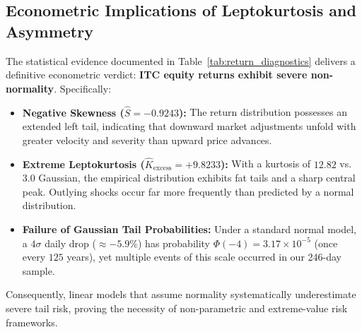 \subsection{Econometric Implications of Leptokurtosis and Asymmetry}

The statistical evidence documented in Table~\ref{tab:return_diagnostics} delivers a definitive econometric verdict: \textbf{ITC equity returns exhibit severe non-normality}. Specifically:
\begin{itemize}[leftmargin=1.2em, itemsep=0.5pt, parsep=0pt]
    \item \textbf{Negative Skewness ($\hat{S} = -0.9243$):} The return distribution possesses an extended left tail, indicating that downward market adjustments unfold with greater velocity and severity than upward price advances.
    \item \textbf{Extreme Leptokurtosis ($\hat{K}_{\text{excess}} = +9.8233$):} With a kurtosis of $12.82$ vs. $3.0$ Gaussian, the empirical distribution exhibits fat tails and a sharp central peak. Outlying shocks occur far more frequently than predicted by a normal distribution.
    \item \textbf{Failure of Gaussian Tail Probabilities:} Under a standard normal model, a $4\sigma$ daily drop ($\approx -5.9\%$) has probability $\Phi(-4) = 3.17 \times 10^{-5}$ (once every $125$ years), yet multiple events of this scale occurred in our 246-day sample.
\end{itemize}

Consequently, linear models that assume normality systematically underestimate severe tail risk, proving the necessity of non-parametric and extreme-value risk frameworks.

\clearpage

